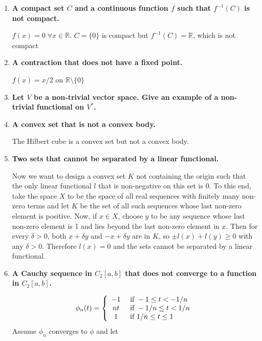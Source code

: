 \documentclass[12pt,letterpaper,reqno]{amsart}
\newcommand{\R}{\mathbb R}
\begin{document}
\begin{enumerate}[1.]
\begin{flushleft}
\end{flushleft}
\item \textbf{A compact set $C$ and a continuous function $f$ such that $f^{-1}(C)$ is not compact.}
\begin{flushleft}
    $f(x) = 0 \; \forall x \in \R$. $C = \{0\}$ is compact but $f^{-1}(C) = \R$, which is not compact
\end{flushleft}
\item \textbf{A contraction that does not have a fixed point.}
\begin{flushleft}
    $f(x) = x/2$ on $\R\setminus\{0\}$
\end{flushleft}
\item \textbf{Let $V$ be a non-trivial vector space. Give an example of a non-trivial functional on $V^*$.}
\item \textbf{A convex set that is not a convex body.}
\begin{flushleft}
    The Hilbert cube is a convex set but not a convex body.
\end{flushleft}
\item \textbf{Two sets that cannot be separated by a linear functional.}
\begin{flushleft}
    Now we want to design a convex set $K$ not containing the origin such that the only linear functional $l$ that is non-negative on this set is 0. To this end, take the space $X$ to be the space of all real sequences with finitely many non-zero terms and let $K$ be the set of all such sequences whose last non-zero element is positive. Now, if $x \in X$, choose $y$ to be any sequence whose last non-zero element is 1 and lies beyond the last non-zero element in $x$. Then for every $\delta > 0$, both $x+\delta y$ and $-x+\delta y$ are in $K$, so $\pm l(x) + l(y) \geq 0$ with any $\delta > 0$. Therefore $l(x) = 0$ and the sets cannot be separated by a linear functional.
\end{flushleft}
\item \textbf{A Cauchy sequence in $C_2[a,b]$ that does not converge to a function in $C_2[a,b]$.}
\begin{flushleft}
    $$\phi _ { n } ( t ) = \left\{ \begin{array} { c l } { - 1 } & { \text { if } - 1 \leq t < - 1 / n } \\ { n t } & { \text { if } - 1 / n \leq t < 1 / n } \\ { 1 } & { \text { if } 1 / n \leq t \leq 1 } \end{array} \right.$$
    Assume $\phi_n$ converges to $\phi$ and let

\end{flushleft}
\end{enumerate}
\end{document}
